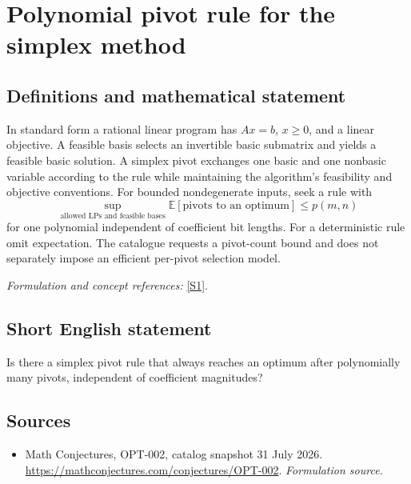 \documentclass[11pt]{article}
\begin{document}
\section*{\texorpdfstring{Polynomial pivot rule for the simplex method}{Polynomial pivot rule for the simplex method}}\label{statement}
\subsection{Definitions and mathematical statement}
In standard form a rational linear program has $Ax=b$, $x\ge0$, and a linear objective. A feasible basis selects an invertible basic submatrix and yields a feasible basic solution. A simplex pivot exchanges one basic and one nonbasic variable according to the rule while maintaining the algorithm's feasibility and objective conventions. For bounded nondegenerate inputs, seek a rule with
\[
 \sup_{\text{allowed LPs and feasible bases}}\mathbb E[\text{pivots to an optimum}]
 \le p(m,n)
\]
for one polynomial independent of coefficient bit lengths. For a deterministic rule omit expectation. The catalogue requests a pivot-count bound and does not separately impose an efficient per-pivot selection model.
\par\smallskip\textit{Formulation and concept references:} \href{https://mathconjectures.com/conjectures/OPT-002}{[S1]}.

\subsection{Short English statement}
Is there a simplex pivot rule that always reaches an optimum after polynomially many pivots, independent of coefficient magnitudes?
\subsection{Sources}
\begin{itemize}
\item[S1]Math Conjectures, OPT-002, catalog snapshot 31 July 2026.
\url{https://mathconjectures.com/conjectures/OPT-002}.
\textit{Formulation source.}
\end{itemize}
\end{document}
